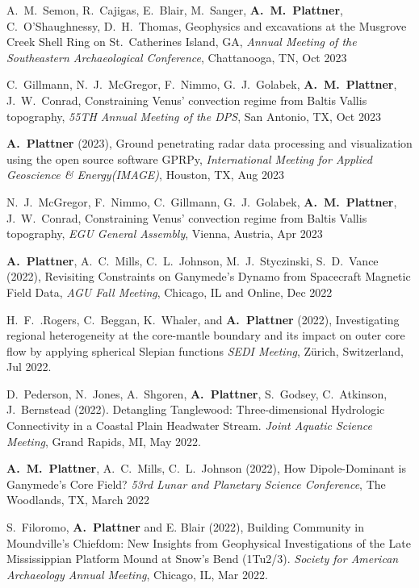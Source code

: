 \documentclass[10pt]{article}
\begin{document}
\spcp
A.~M.~Semon, R.~Cajigas, E.~Blair, M.~Sanger, \textbf{A.~M.~Plattner}, C.~O'Shaughnessy, D.~H.~Thomas, Geophysics and excavations at the Musgrove Creek Shell Ring on St.\ Catherines Island, GA, \emph{Annual Meeting of the Southeastern Archaeological Conference}, Chattanooga, TN, Oct 2023

\spcp
C.~Gillmann, N.~J.~McGregor, F.~Nimmo, G.~J.~Golabek, \textbf{A.~M.~Plattner}, J.~W.~Conrad, Constraining Venus' convection regime from Baltis Vallis topography, \emph{55TH Annual Meeting of the DPS}, San Antonio, TX, Oct 2023


\spcp \textbf{A.~Plattner} (2023), Ground penetrating radar data processing and visualization using the open source software GPRPy, \emph{International Meeting for Applied Geoscience \& Energy(IMAGE)}, Houston, TX, Aug 2023

\spcp
N.~J.~McGregor, F.~Nimmo, C.~Gillmann, G.~J.~Golabek, \textbf{A.~M.~Plattner}, J.~W.~Conrad, Constraining Venus' convection regime from Baltis Vallis topography, \emph{EGU General Assembly}, Vienna, Austria, Apr 2023

\spcp \textbf{A.~Plattner}, A.~C.~Mills, C.~L.~Johnson,
M.~J.~Styczinski, S.~D.~Vance (2022), Revisiting Constraints on
Ganymede's Dynamo from Spacecraft Magnetic Field Data, \emph{AGU Fall
Meeting}, Chicago, IL and Online, Dec 2022

\spcp H.~F.~.Rogers, C.~Beggan, K.~Whaler, and \textbf{A.~Plattner}
(2022), Investigating regional heterogeneity at the core-mantle
boundary and its impact on outer core flow by applying spherical
Slepian functions \emph{SEDI Meeting}, Z\"urich, Switzerland, Jul 2022.

\spcp D.~Pederson, N.~Jones, A.~Shgoren, \textbf{A.~Plattner},
S.~Godsey, C.~Atkinson, J.~Bernstead (2022). Detangling Tanglewood:
Three-dimensional Hydrologic Connectivity in a Coastal Plain Headwater
Stream. \emph{Joint Aquatic Science Meeting}, Grand Rapids, MI, May
2022.

\spcp \textbf{A.~M.~Plattner}, A.~C.~Mills, C.~L.~Johnson (2022), How
Dipole-Dominant is Ganymede’s Core Field?  \emph{53rd Lunar and
Planetary Science Conference}, The Woodlands, TX, March 2022

\spcp S.~Filoromo, \textbf{A.~Plattner} and E. Blair (2022), Building
Community in Moundville's Chiefdom: New Insights from Geophysical
Investigations of the Late Mississippian Platform Mound at Snow's Bend
(1Tu2/3). \emph{Society for American Archaeology Annual Meeting}, Chicago,
IL, Mar 2022.
\end{document}
